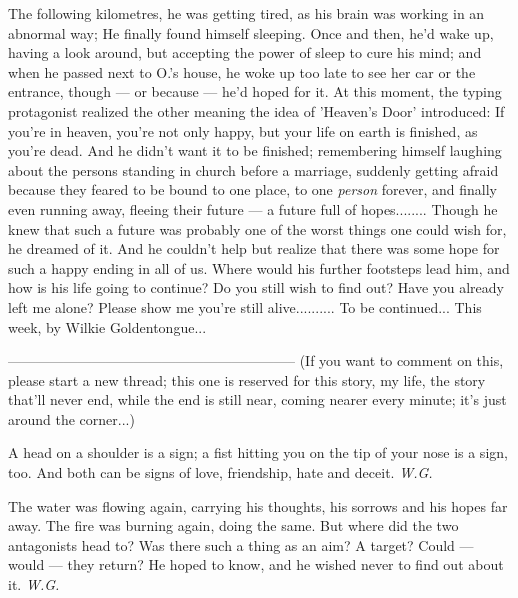 The following kilometres, he was getting tired, as his brain was working in an abnormal way; He finally found himself sleeping. Once and then, he'd wake up, having a look around, but accepting the power of sleep to cure his mind; and when he passed next to O.'s house, he woke up too late to see her car or the entrance, though --- or because --- he'd hoped for it. At this moment, the typing protagonist realized the other meaning the idea of 'Heaven's Door' introduced: If you're in heaven, you're not only happy, but your life on earth is finished, as you're dead. 
And he didn't want it to be finished; remembering himself laughing about the persons standing in church before a marriage, suddenly getting afraid because they feared to be bound to one place, to one \emph{person} forever, and finally even running away, fleeing their future --- a future full of hopes........
Though he knew that such a future was probably one of the worst things one could wish for, he dreamed of it. 
And he couldn't help but realize that there was some hope for such a happy ending in all of us. 
Where would his further footsteps lead him, and how is his life going to continue?
Do you still wish to find out?
Have you already left me alone?
Please show me you're still alive..........
To be continued...
This week, by Wilkie Goldentongue...

--------------------------------------------------------------
(If you want to comment on this, please start a new thread; this one is reserved for this story, my life, the story that'll never end, while the end is still near, coming nearer every minute; it's just around the corner...)

A head on a shoulder 
is a sign; 
a fist hitting you 
on the tip of your nose 
is a sign, too. 
And both can be signs 
of love, friendship, 
hate and deceit. 
\emph{W.G.}

The water was flowing again, 
carrying his thoughts, his sorrows 
and his hopes far away. 
The fire was burning again, 
doing the same. 
But where did the two antagonists head to? 
Was there such a thing as an aim? 
A target? 
Could --- would --- they return? 
He hoped to know, and he wished never to find out about it. 
\emph{W.G.}

